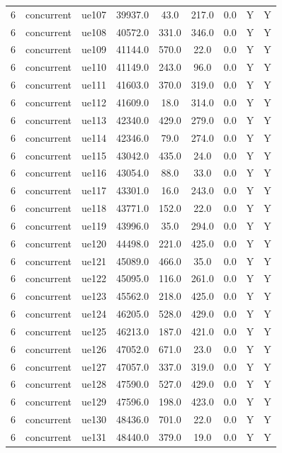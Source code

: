 \begin{table}[ht]
\begin{tabular}{|c|c|c|c|c|c|c|c|c|}
6 & concurrent & ue107 & 39937.0 & 43.0 & 217.0 & 0.0 & Y & Y \\
6 & concurrent & ue108 & 40572.0 & 331.0 & 346.0 & 0.0 & Y & Y \\
6 & concurrent & ue109 & 41144.0 & 570.0 & 22.0 & 0.0 & Y & Y \\
6 & concurrent & ue110 & 41149.0 & 243.0 & 96.0 & 0.0 & Y & Y \\
6 & concurrent & ue111 & 41603.0 & 370.0 & 319.0 & 0.0 & Y & Y \\
6 & concurrent & ue112 & 41609.0 & 18.0 & 314.0 & 0.0 & Y & Y \\
6 & concurrent & ue113 & 42340.0 & 429.0 & 279.0 & 0.0 & Y & Y \\
6 & concurrent & ue114 & 42346.0 & 79.0 & 274.0 & 0.0 & Y & Y \\
6 & concurrent & ue115 & 43042.0 & 435.0 & 24.0 & 0.0 & Y & Y \\
6 & concurrent & ue116 & 43054.0 & 88.0 & 33.0 & 0.0 & Y & Y \\
6 & concurrent & ue117 & 43301.0 & 16.0 & 243.0 & 0.0 & Y & Y \\
6 & concurrent & ue118 & 43771.0 & 152.0 & 22.0 & 0.0 & Y & Y \\
6 & concurrent & ue119 & 43996.0 & 35.0 & 294.0 & 0.0 & Y & Y \\
6 & concurrent & ue120 & 44498.0 & 221.0 & 425.0 & 0.0 & Y & Y \\
6 & concurrent & ue121 & 45089.0 & 466.0 & 35.0 & 0.0 & Y & Y \\
6 & concurrent & ue122 & 45095.0 & 116.0 & 261.0 & 0.0 & Y & Y \\
6 & concurrent & ue123 & 45562.0 & 218.0 & 425.0 & 0.0 & Y & Y \\
6 & concurrent & ue124 & 46205.0 & 528.0 & 429.0 & 0.0 & Y & Y \\
6 & concurrent & ue125 & 46213.0 & 187.0 & 421.0 & 0.0 & Y & Y \\
6 & concurrent & ue126 & 47052.0 & 671.0 & 23.0 & 0.0 & Y & Y \\
6 & concurrent & ue127 & 47057.0 & 337.0 & 319.0 & 0.0 & Y & Y \\
6 & concurrent & ue128 & 47590.0 & 527.0 & 429.0 & 0.0 & Y & Y \\
6 & concurrent & ue129 & 47596.0 & 198.0 & 423.0 & 0.0 & Y & Y \\
6 & concurrent & ue130 & 48436.0 & 701.0 & 22.0 & 0.0 & Y & Y \\
6 & concurrent & ue131 & 48440.0 & 379.0 & 19.0 & 0.0 & Y & Y \\

\end{tabular}
\end{table}
